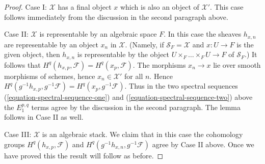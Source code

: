 \documentclass[10pt,a4paper]{amsart}
\theoremstyle{plain}
\theoremstyle{definition}
\theoremstyle{remark}
\numberwithin{equation}{subsection}
\begin{document}
\begin{proof}
\medskip\noindent
Case I: $\mathcal{X}$ has a final object $x$ which is also an object of
$\mathcal{X}'$. This case follows immediately from the discussion
in the second paragraph above.

\medskip\noindent
Case II: $\mathcal{X}$ is representable by an algebraic space $F$.
In this case the sheaves $h_{x, n}$ are representable by an
object $x_n$ in $\mathcal{X}$. (Namely, if $\mathcal{S}_F = \mathcal{X}$
and $x : U \to F$ is the given object, then $h_{x, n}$ is representable
by the object $U \times_F \ldots \times_F U \to F$ of $\mathcal{S}_F$.)
It follows that $H^q(h_{x, p}, \mathcal{F}) = H^q(x_p, \mathcal{F})$.
The morphisms $x_n \to x$ lie over smooth morphisms of schemes, hence
$x_n \in \mathcal{X}'$ for all $n$. Hence
$H^q(g^{-1}h_{x, p}, g^{-1}\mathcal{F}) = H^q(x_p, g^{-1}\mathcal{F})$.
Thus in the two spectral sequences
(\ref{equation-spectral-sequence-one}) and
(\ref{equation-spectral-sequence-two}) above the $E_1^{p, q}$ terms agree
by the discussion in the second paragraph. The lemma follows in Case II
as well.

\medskip\noindent
Case III: $\mathcal{X}$ is an algebraic stack. We claim that in this case
the cohomology groups $H^q(h_{x, p}, \mathcal{F})$ and
$H^q(g^{-1}h_{x, n}, g^{-1}\mathcal{F})$ agree by Case II above.
Once we have proved this the result will follow as before.


\end{proof}
\end{document}
